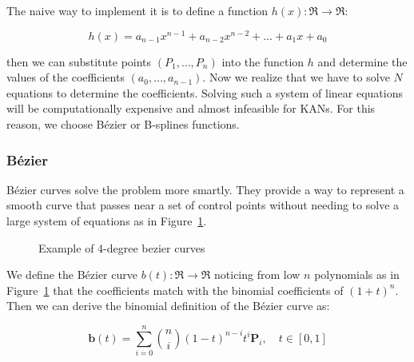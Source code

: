 \documentclass[12pt,a4paper]{article}
\begin{document}
The naive way to implement it is to define a function $h(x): \Re \to \Re$:

$$h(x) = a_{n-1}x^{n-1} + a_{n-2}x^{n-2} + \dots + a_1x +a_0 $$

then we can substitute points $(P_1, \dots,P_n)$ into the function $h$ and determine the values of the coefficients $(a_0, \dots,a_{n-1})$. Now we realize that we have to solve $N$ equations to determine the coefficients. Solving such a system of linear equations will be computationally expensive and almost infeasible for KANs. For this reason, we choose Bézier or B-splines functions.

\subsubsection{Bézier}
Bézier curves solve the problem more smartly. They provide a way to represent a smooth curve that passes near a set of control points without needing to solve a large system of equations as in Figure~\ref{fig:bezier2}.   
\begin{figure}[H]
    \centering
    \hfill
    \caption{Example of 4-degree bezier curves}
    \label{fig:bezier2}
\end{figure}


We define the Bézier curve $b(t): \Re \to \Re$ noticing from low $n$ polynomials as in Figure~\ref{fig:bezier2} that the coefficients match with the binomial coefficients of $(1+t)^n$. Then we can derive the binomial definition of the Bézier curve as:

\[
\mathbf{b}(t) = \sum_{i=0}^n \binom{n}{i} (1-t)^{n-i} t^i \mathbf{P}_i, \quad t \in [0, 1]
\]
\end{document}
